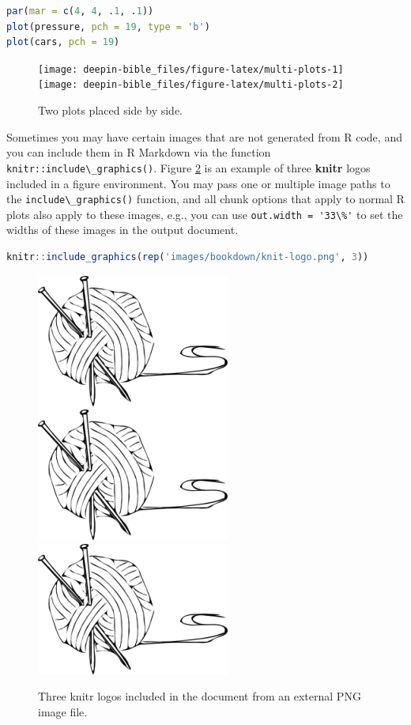 \documentclass[doctor,openright,twoside]{sjtuthesis}
\newcommand{\passthrough}[1]{#1}
\theoremstyle{plain}
\theoremstyle{definition}
\theoremstyle{remark}
\theoremstyle{ocrenumbox}
\theoremstyle{plain}
\begin{document}
\begin{lstlisting}[language=R]
par(mar = c(4, 4, .1, .1))
plot(pressure, pch = 19, type = 'b')
plot(cars, pch = 19)
\end{lstlisting}

\begin{figure}
\texttt{[image: deepin-bible\_files/figure-latex/multi-plots-1]} \texttt{[image: deepin-bible\_files/figure-latex/multi-plots-2]} \caption[Two plots placed side by side]{Two plots placed side by side.}\label{fig:multi-plots}
\end{figure}

Sometimes you may have certain images that are not generated from R
code, and you can include them in R Markdown via the function
\passthrough{\lstinline!knitr::include\_graphics()!}. Figure
\ref{fig:knitr-logo} is an example of three \textbf{knitr} logos
included in a figure environment. You may pass one or multiple image
paths to the
\passthrough{\lstinline!include\_graphics()!}
function, and all chunk options that apply to normal R plots also apply
to these images, e.g., you can use
\passthrough{\lstinline!out.width = '33\%'!} to set the widths of these
images in the output document.

\begin{lstlisting}[language=R]
knitr::include_graphics(rep('images/bookdown/knit-logo.png', 3))
\end{lstlisting}

\begin{figure}
\includegraphics[width=0.328\linewidth]{images/bookdown/knit-logo} \includegraphics[width=0.328\linewidth]{images/bookdown/knit-logo} \includegraphics[width=0.328\linewidth]{images/bookdown/knit-logo} \caption[Three knitr logos included in the document from an external PNG image file]{Three knitr logos included in the document from an external PNG image file.}\label{fig:knitr-logo}
\end{figure}
\end{document}
